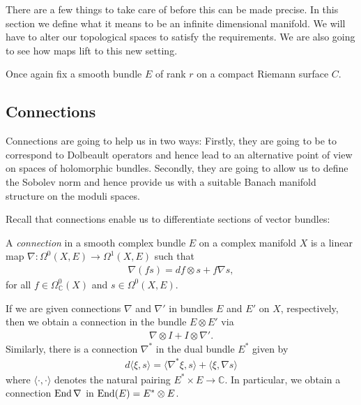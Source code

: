 \documentclass[12pt]{ociamthesis}  %
\begin{document}
There are a few things to take care of before this can be made
precise. In this section we define what it means to be an infinite
dimensional manifold. We will have to alter our topological spaces
to satisfy the requirements. We are also going to see how maps
lift to this new setting.

Once again fix a smooth bundle $E$ of rank $r$ on a compact
Riemann surface $C$.

\subsection{Connections}

Connections are going to help us in two ways: Firstly, they are going to
be to correspond to Dolbeault operators and hence lead to an
alternative point of view on spaces of holomorphic bundles.
Secondly, they are going to allow us to define the Sobolev norm and
hence provide us with a suitable Banach manifold structure on
the moduli spaces.

Recall that connections enable us to differentiate sections of
vector bundles:

\begin{definition}
  A \emph{connection} in a smooth complex bundle $E$ on
  a complex manifold $X$ is a linear map $\nabla : \Omega^0(X,E) \to \Omega^1(X,E)$
  such that
  \begin{align*}
    \nabla (fs) = df \otimes s + f\nabla s,
  \end{align*}
  for all $f\in \Omega^0_{\mathbb C}(X)$ and $s\in\Omega^0(X,E)$.
\end{definition}

\begin{example}\label{ex:connection_on_end}
  If we are given connections $\nabla$ and $\nabla'$ in bundles $E$ and $E'$ on $X$,
  respectively, then we obtain a connection in the bundle $E\otimes E'$ via
  \begin{align*}
    \nabla \otimes I + I \otimes \nabla'.
  \end{align*}
  Similarly, there is a connection $\nabla^*$ in the dual bundle $E^*$ given by
  \begin{align*}
    d\langle \xi,s\rangle
    = \langle \nabla^*\xi, s \rangle + \langle \xi,\nabla s\rangle
  \end{align*}
  where $\langle\cdot,\cdot\rangle$ denotes the natural pairing $E^*\times E\to\mathbb{C}$.
  In particular, we obtain a connection $\operatorname{End}\nabla$ in $\operatorname{End}(E) = E^* \otimes E$.
\end{example}
\end{document}
